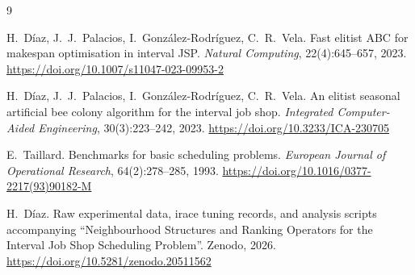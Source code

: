 \documentclass[a4paper,11pt]{article}
\begin{document}
\bigskip


\begin{thebibliography}{9}

H.~D\'iaz, J.~J.~Palacios, I.~Gonz\'alez-Rodr\'iguez, C.~R.~Vela.
\newblock Fast elitist {ABC} for makespan optimisation in interval {JSP}.
\newblock \textit{Natural Computing}, 22(4):645--657, 2023.
\newblock \url{https://doi.org/10.1007/s11047-023-09953-2}

H.~D\'iaz, J.~J.~Palacios, I.~Gonz\'alez-Rodr\'iguez, C.~R.~Vela.
\newblock An elitist seasonal artificial bee colony algorithm for the interval job shop.
\newblock \textit{Integrated Computer-Aided Engineering}, 30(3):223--242, 2023.
\newblock \url{https://doi.org/10.3233/ICA-230705}

E.~Taillard.
\newblock Benchmarks for basic scheduling problems.
\newblock \textit{European Journal of Operational Research}, 64(2):278--285, 1993.
\newblock \url{https://doi.org/10.1016/0377-2217(93)90182-M}

H.~D\'iaz.
\newblock Raw experimental data, irace tuning records, and analysis scripts
  accompanying ``Neighbourhood Structures and Ranking Operators for the
  Interval Job Shop Scheduling Problem''.
\newblock Zenodo, 2026.
\newblock \url{https://doi.org/10.5281/zenodo.20511562}

\end{thebibliography}
\end{document}
